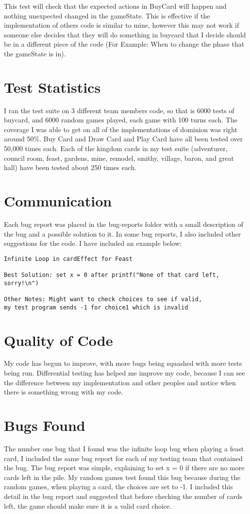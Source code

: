 \documentclass[letterpaper,12pt]{article}
\begin{document}
This test will check that the expected actions in BuyCard will happen and 
nothing unexpected changed in the gameState. This is effective if the 
implementation of others code is similar to mine, however this may not work
if someone else decides that they will do something in buycard that I decide 
should be in a different piece of the code (For Example: When to change the
phase that the gameState is in).


\section{Test Statistics}
I ran the test suite on 3 different team members code, so that is 6000 tests of buycard,
and 6000 random games played, each game with 100 turns each. The coverage I was able to get
on all of the implementations of dominion was right around 50\%. Buy Card and Draw Card and 
Play Card have all been tested over 50,000 times each. Each of the kingdom cards in my test suite
(adventurer, council room, feast, gardens, mine, remodel, smithy, village, baron, and great hall)
have been tested about 250 times each.

\section{Communication}
Each bug report was placed in the bug-reports folder with a small description of the bug and a possible
solution to it. In some bug reports, I also included other suggestions for the code. I have included an
example below:

\begin{verbatim}
Infinite Loop in cardEffect for Feast

Best Solution: set x = 0 after printf("None of that card left, sorry!\n")

Other Notes: Might want to check choices to see if valid, 
my test program sends -1 for choice1 which is invalid
\end{verbatim}

\section{Quality of Code}
My code has begun to improve, with more bugs being squashed with more tests being run. Differential
testing has helped me improve my code, because I can see the difference between my implementation and
other peoples and notice when there is something wrong with my code. 

\section{Bugs Found}
The number one bug that I found was the infinite loop bug when playing a feast card, I included
the same bug report for each of my testing team that contained the bug. The bug report was simple,
explaining to set x = 0 if there are no more cards left in the pile. My random games test found this bug
because during the random games, when playing a card, the choices are set to -1. I included this detail in
the bug report and suggested that before checking the number of cards left, the game should make sure it is
a valid card choice.
\end{document}

